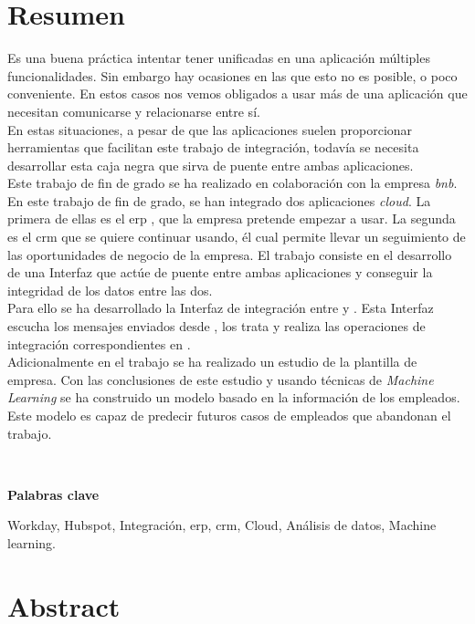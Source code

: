 \chapter*{Resumen}
	
	Es una buena práctica intentar tener unificadas en una aplicación múltiples funcionalidades.
	Sin embargo hay ocasiones en las que esto no es posible, o poco conveniente.
	En estos casos nos vemos obligados a usar más de una aplicación que necesitan comunicarse y relacionarse entre sí.\\
	
	En estas situaciones, a pesar de que las aplicaciones suelen proporcionar herramientas que facilitan este trabajo de integración, todavía se necesita desarrollar esta
	caja negra que sirva de puente entre ambas aplicaciones.\\
	
	Este trabajo de fin de grado se ha realizado en colaboración con la empresa \textit{\acrfull{bnb}}.
	En este trabajo de fin de grado, se han integrado dos aplicaciones \textit{cloud}. La primera de ellas es el \acrfull{erp} \wday{}, que la empresa pretende empezar a usar.
	La segunda es el \acrfull{crm} \hs{} que se quiere continuar usando, él cual permite llevar un seguimiento de las oportunidades de negocio de la empresa.
	El trabajo consiste en el desarrollo de una Interfaz que actúe de puente entre ambas aplicaciones y conseguir la integridad de los datos entre las dos. \\
	
	
	Para ello se ha desarrollado la Interfaz de integración entre \hs{} y \wday{}. Esta Interfaz escucha los mensajes enviados desde \hs{}, los trata y realiza las operaciones de integración correspondientes en \wday{}.\\

	Adicionalmente en el trabajo se ha realizado un estudio de la plantilla de empresa.
	Con las conclusiones de este estudio y usando técnicas de \textit{Machine Learning} se ha construido
	un modelo basado en la información de los empleados. Este modelo es capaz de predecir futuros casos de empleados que abandonan el trabajo.
	

	\
	
	\textbf{Palabras clave}
    
    Workday, Hubspot, Integración, \acrfull{erp}, \acrfull{crm}, Cloud, Análisis de datos, Machine learning.


\chapter*{Abstract}
	
